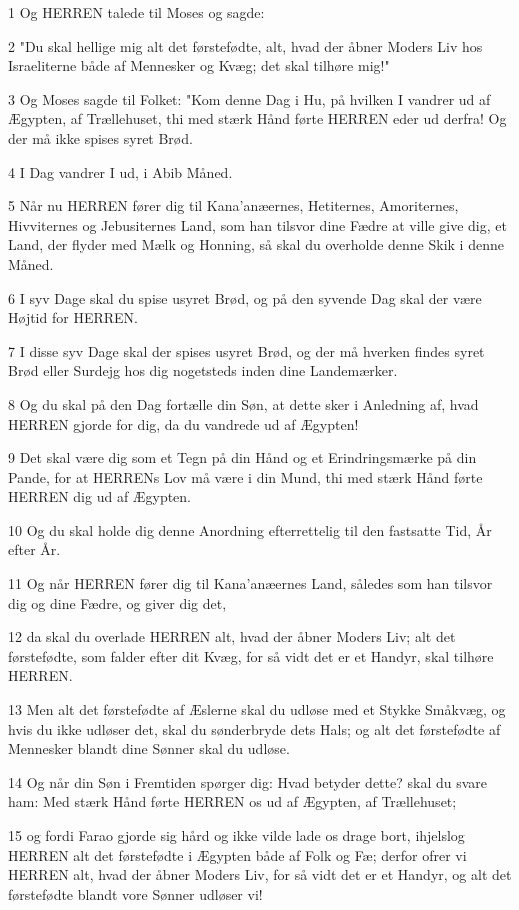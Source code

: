 \par 1 Og HERREN talede til Moses og sagde:
\par 2 "Du skal hellige mig alt det førstefødte, alt, hvad der åbner Moders Liv hos Israeliterne både af Mennesker og Kvæg; det skal tilhøre mig!"
\par 3 Og Moses sagde til Folket: "Kom denne Dag i Hu, på hvilken I vandrer ud af Ægypten, af Trællehuset, thi med stærk Hånd førte HERREN eder ud derfra! Og der må ikke spises syret Brød.
\par 4 I Dag vandrer I ud, i Abib Måned.
\par 5 Når nu HERREN fører dig til Kana'anæernes, Hetiternes, Amoriternes, Hivviternes og Jebusiternes Land, som han tilsvor dine Fædre at ville give dig, et Land, der flyder med Mælk og Honning, så skal du overholde denne Skik i denne Måned.
\par 6 I syv Dage skal du spise usyret Brød, og på den syvende Dag skal der være Højtid for HERREN.
\par 7 I disse syv Dage skal der spises usyret Brød, og der må hverken findes syret Brød eller Surdejg hos dig nogetsteds inden dine Landemærker.
\par 8 Og du skal på den Dag fortælle din Søn, at dette sker i Anledning af, hvad HERREN gjorde for dig, da du vandrede ud af Ægypten!
\par 9 Det skal være dig som et Tegn på din Hånd og et Erindringsmærke på din Pande, for at HERRENs Lov må være i din Mund, thi med stærk Hånd førte HERREN dig ud af Ægypten.
\par 10 Og du skal holde dig denne Anordning efterrettelig til den fastsatte Tid, År efter År.
\par 11 Og når HERREN fører dig til Kana'anæernes Land, således som han tilsvor dig og dine Fædre, og giver dig det,
\par 12 da skal du overlade HERREN alt, hvad der åbner Moders Liv; alt det førstefødte, som falder efter dit Kvæg, for så vidt det er et Handyr, skal tilhøre HERREN.
\par 13 Men alt det førstefødte af Æslerne skal du udløse med et Stykke Småkvæg, og hvis du ikke udløser det, skal du sønderbryde dets Hals; og alt det førstefødte af Mennesker blandt dine Sønner skal du udløse.
\par 14 Og når din Søn i Fremtiden spørger dig: Hvad betyder dette? skal du svare ham: Med stærk Hånd førte HERREN os ud af Ægypten, af Trællehuset;
\par 15 og fordi Farao gjorde sig hård og ikke vilde lade os drage bort, ihjelslog HERREN alt det førstefødte i Ægypten både af Folk og Fæ; derfor ofrer vi HERREN alt, hvad der åbner Moders Liv, for så vidt det er et Handyr, og alt det førstefødte blandt vore Sønner udløser vi!
